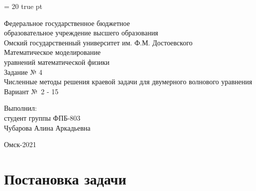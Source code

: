 \documentclass[a4paper,12pt]{article}
\begin{document}
	
	\graphicspath{{figures/}}
	
	\baselineskip = 20 true pt \vspace{40mm} \large
	\begin{titlepage}
		\begin{center}
			Федеральное государственное бюджетное\\ образовательное
			учреждение высшего образования\\[0.5cm]
			Омский государственный университет им. Ф.М. Достоевского\\[3cm]
			
			Математическое моделирование\\ уравнений математической физики\\[2cm]
			Задание № 4\\[1cm]
			Численные методы решения краевой задачи для двумерного волнового уравнения\\[3cm]
Вариант №\ 2 - 15\\[2cm]
\end{center}

\begin{flushright}
Выполнил:\\
студент группы ФПБ-803\\
Чубарова Алина Аркадьевна\\[3cm]
\end{flushright}

\begin{center}
Омск-2021
\end{center}
\end{titlepage}

\setcounter{page}{2} 
\tableofcontents
\newpage

\newpage
\section{Постановка задачи}
\label{sec:normal}
\end{document}
